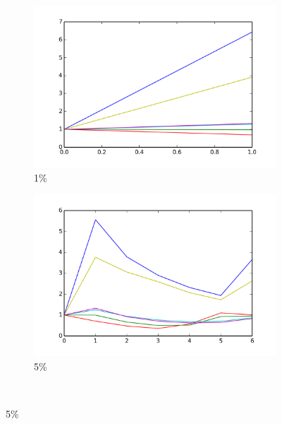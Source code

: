 \documentclass[12pt, a4paper, pdflatex, leqno, twoside]{report}
\begin{document}
\begin{figure}[htbp]
  \begin{subfigure}{.5\linewidth}\centering
    \includegraphics[width=1.1\textwidth]{graphics/convergence01.png}
    \caption{1\%\label{fig:conv.ALL:01}}
  \end{subfigure}
  \begin{subfigure}{.5\linewidth}\centering
    \includegraphics[width=1.1\textwidth]{graphics/convergence05.png}
    \caption{5\%\label{fig:conv.ALL:05}}
  \end{subfigure}\\[1ex]


\end{figure}
\end{document}
